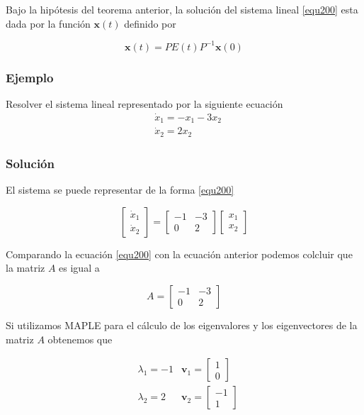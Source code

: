 \documentclass[12pt]{book}
\theoremstyle{definition}
\theoremstyle{remark}
\theoremstyle{plain}
\begin{document}
Bajo la hipótesis del teorema anterior, la solución del sistema lineal \ref{equ200} esta dada por la función $\mathbf{x}(t)$ definido por

\begin{equation}
\mathbf{x}(t) = P E(t) P^{-1} \mathbf{x}(0) 
\label{equ203}
\end{equation}

\subsubsection{Ejemplo}
Resolver el sistema lineal representado por la siguiente ecuación
\begin{align*}
&\dot{x}_1  =  -x_1-3x_2 \\
&\dot{x}_2  =  2x_2
\end{align*}
 
 \subsubsection*{Solución}
 El sistema se puede representar de la forma \ref{equ200} 
 
\begin{equation*}
\begin{bmatrix}
\dot{x}_1\\
\dot{x}_2
\end{bmatrix}= \begin{bmatrix}
-1 & -3\\
0 & 2
\end{bmatrix}
\begin{bmatrix}
x_1\\
x_2
\end{bmatrix}
\end{equation*}

Comparando la ecuación \ref{equ200} con la ecuación anterior podemos colcluir que la matriz $A$ es igual a

\begin{equation*}
A = \begin{bmatrix}
-1 & -3\\
0 & 2
\end{bmatrix}
\end{equation*}

Si utilizamos MAPLE para el cálculo de los eigenvalores y los eigenvectores de la matriz $A$ obtenemos que

\begin{align*}
&\lambda _1 = -1 & \mathbf{v}_1 = \begin{bmatrix}
1\\
0
\end{bmatrix} \\
&\lambda_ 2 = 2 & \mathbf{v} _2 = \begin{bmatrix}
-1\\
1
\end{bmatrix} \\
\end{align*}
\end{document}
